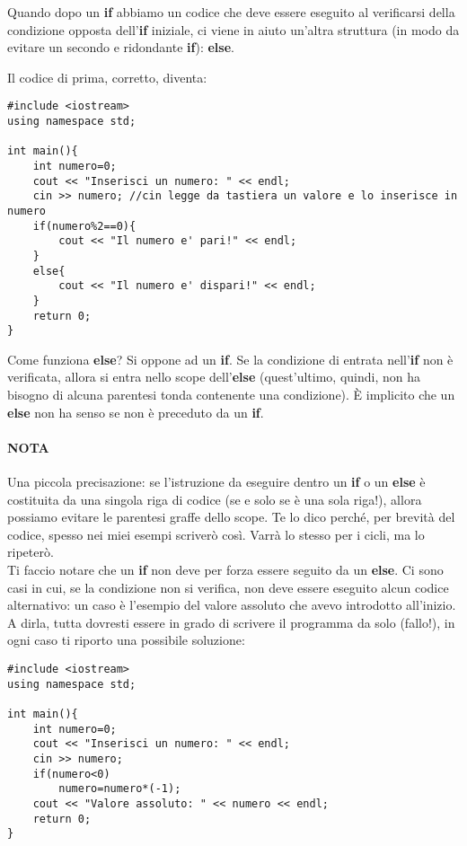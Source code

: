 Quando dopo un \textbf{if} abbiamo un codice che deve essere eseguito al verificarsi della condizione opposta dell'\textbf{if} iniziale, ci viene in aiuto un'altra struttura (in modo da evitare un secondo e ridondante \textbf{if}): \textbf{else}.

Il codice di prima, corretto, diventa:
	\begin{lstlisting}
#include <iostream>
using namespace std;
	
int main(){
	int numero=0;
	cout << "Inserisci un numero: " << endl;
	cin >> numero; //cin legge da tastiera un valore e lo inserisce in numero
	if(numero%2==0){
		cout << "Il numero e' pari!" << endl;
	}
	else{
		cout << "Il numero e' dispari!" << endl;
	}
	return 0;
}
	\end{lstlisting}
	Come funziona \textbf{else}? Si oppone ad un \textbf{if}. Se la condizione di entrata nell'\textbf{if} non è verificata, allora si entra nello scope dell'\textbf{else} (quest'ultimo, quindi, non ha bisogno di alcuna parentesi tonda contenente una condizione). \`E implicito che un \textbf{else} non ha senso se non è preceduto da un \textbf{if}.
	
	\paragraph{NOTA} Una piccola precisazione: se l'istruzione da eseguire dentro un \textbf{if} o un \textbf{else} è costituita da una singola riga di codice (se e solo se è una sola riga!), allora possiamo evitare le parentesi graffe dello scope. Te lo dico perché, per brevità del codice, spesso nei miei esempi scriverò così. Varrà lo stesso per i cicli, ma lo ripeterò. \\
	
	Ti faccio notare che un \textbf{if} non deve per forza essere seguito da un \textbf{else}. Ci sono casi in cui, se la condizione non si verifica, non deve essere eseguito alcun codice alternativo: un caso è l'esempio del valore assoluto che avevo introdotto all'inizio. A dirla, tutta dovresti essere in grado di scrivere il programma da solo (fallo!), in ogni caso ti riporto una possibile soluzione:
	\begin{lstlisting}
#include <iostream>
using namespace std;

int main(){
	int numero=0;
	cout << "Inserisci un numero: " << endl;
	cin >> numero;
	if(numero<0)
		numero=numero*(-1);
	cout << "Valore assoluto: " << numero << endl;
	return 0;		
}
	\end{lstlisting}
	
